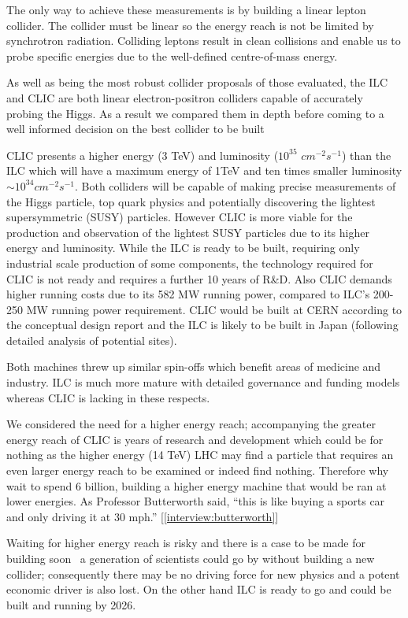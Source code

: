 The only way to achieve these measurements is by building a linear lepton collider. The collider must be linear so the energy reach is not be limited by synchrotron radiation. Colliding leptons result in clean collisions and enable us to probe specific energies due to the well-defined centre-of-mass energy.

As well as being the most robust collider proposals of those evaluated, the ILC and CLIC are both linear electron-positron colliders capable of accurately probing the Higgs. As a result we compared them in depth before coming to a well informed decision on the best collider to be built

CLIC presents a higher energy (3 TeV) and luminosity ($10^{35}$ $cm^{-2} s^{-1}$) than the ILC which will have a maximum energy of 1TeV and ten times smaller luminosity $\sim10^{34} cm^{-2} s^{-1}$. Both colliders will be capable of making precise measurements of the Higgs particle, top quark physics and potentially discovering the lightest supersymmetric (SUSY) particles. However CLIC is more viable for the production and observation of the lightest SUSY particles due to its higher energy and luminosity. While the ILC is ready to be built, requiring only industrial scale production of some components, the technology required for CLIC is not ready and requires a further 10 years of R\&D. Also CLIC demands higher running costs due to its 582 MW running power, compared to ILC's 200-250 MW running power requirement. CLIC would be built at CERN according to the conceptual design report and the ILC is likely to be built in Japan (following detailed analysis of potential sites).  

Both machines threw up similar spin-offs which benefit areas of medicine and industry. ILC is much more mature with detailed governance and funding models whereas CLIC is lacking in these respects.

We considered the need for a higher energy reach; accompanying the greater energy reach of CLIC is years of research and development which could be for nothing as the higher energy (14 TeV) LHC may find a particle that requires an even larger energy reach to be examined or indeed find nothing. Therefore why wait to spend 6 billion, building a higher energy machine that would be ran at lower energies. As Professor Butterworth said, ``this is like buying a sports car and only driving it at 30 mph.'' [\ref{interview:butterworth}]

Waiting for higher energy reach is risky and there is a case to be made for building soon \textemdash \, a generation of scientists could go by without building a new collider; consequently there may be no driving force for new physics and a potent economic driver is also lost. On the other hand ILC is ready to go and could be built and running by 2026.

